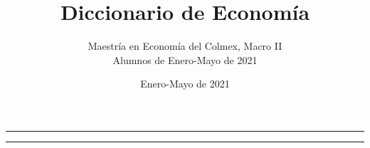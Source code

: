 \documentclass{article}
\begin{document}
\sectionfont{\fontsize{21}{15}\selectfont}

\title{ Diccionario de Economía}
\author{Maestría en Economía del Colmex, Macro II \\ Alumnos de Enero-Mayo de 2021}
\date{Enero-Mayo de 2021}

\maketitle


\begin{center}
\begin{adjustwidth}{1in}{1in}
{\color{equipo3} \rule{\linewidth}{0.5mm} }
\vspace{-8mm}
\renewcommand*\contentsname{Índice por letra inicial}
\renewcommand{\cftdot}{}
\tableofcontents
{\color{equipo3} \rule{\linewidth}{0.5mm} }
\end{adjustwidth}
\end{center}
\end{document}
